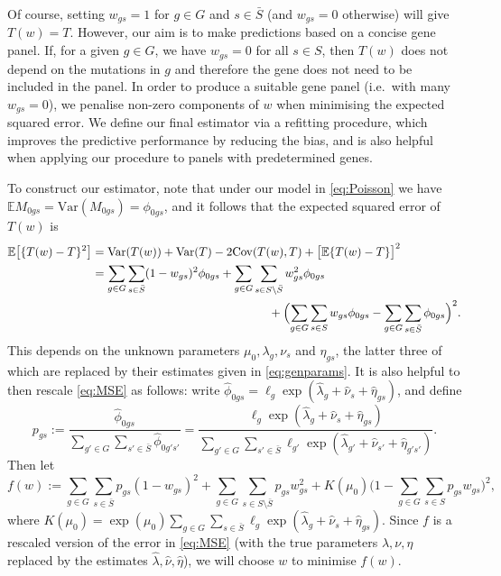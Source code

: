 \documentclass[12pt]{article}
\newcommand{\var}{\mathrm{Var}}
\begin{document}
Of course, setting $w_{gs}= 1$ for $g \in G$ and $s \in \bar{S}$ (and $w_{gs} = 0$ otherwise) will give $T(w) = T$.  However, our aim is to make predictions based on a concise gene panel. If, for a given $g \in G$, we have $w_{gs} = 0$ for all $s \in S$, then $T(w)$ does not depend on the mutations in $g$ and therefore the gene does not need to be included in the panel. In order to produce a suitable gene panel (i.e.~with many $w_{gs} = 0$), we penalise non-zero components of $w$ when minimising the expected squared error. We define our final estimator via a refitting procedure, which improves the predictive performance by reducing the bias, and is also helpful when applying our procedure to panels with predetermined genes.

To construct our estimator, note that under our model in \eqref{eq:Poisson} we have $\mathbb{E}M_{0gs} = \var(M_{0gs}) = \phi_{0gs}$, and it follows that the expected squared error of $T(w)$ is
\begin{align}
\label{eq:MSE}
\mathbb{E}\bigl[\{T(w) - T\}^2\bigr] & = \mathrm{Var}(T(w)) + \mathrm{Var}(T) - 2\mathrm{Cov}(T(w), T) + \bigl[\mathbb{E}\{T(w) - T\}\bigr]^2  \nonumber \\
& = \sum_{g \in G} \sum_{s \in \bar{S}}(1- w_{gs})^2\phi_{0gs} + \sum_{g \in G} \sum_{s \in S \setminus \bar{S}}w_{gs}^2\phi_{0gs}  \nonumber \\ & \hspace{150pt} + \Bigl(\sum_{g \in G}\sum_{s \in S}w_{gs}\phi_{0gs}
- \sum_{g \in G} \sum_{s \in \bar{S}}\phi_{0gs} \Bigr)^2.
\end{align} 
This depends on the unknown parameters $\mu_0, \lambda_g, \nu_s$ and $\eta_{gs}$, the latter three of which are replaced by their estimates given in \eqref{eq:genparams}.  It is also helpful to then rescale  \eqref{eq:MSE} as follows: write $\hat{\phi}_{0gs} = \ell_g\exp(\hat{\lambda}_g + \hat{\nu}_s + \hat{\eta}_{gs})$, and define
\[
p_{gs}  := \frac{\hat{\phi}_{0gs}}{\sum_{g' \in G} \sum_{s' \in \bar{S}} \hat{\phi}_{0g's'}} = \frac{\ell_g \exp(\hat{\lambda}_g + \hat{\nu}_s + \hat{\eta}_{gs})}{\sum_{g'\in G} \sum_{s'\in \bar{S}} \ell_{g'} \exp(\hat{\lambda}_{g'} + \hat{\nu}_{s'} + \hat{\eta}_{g's'})}.
\]
Then let
\[
f(w) := \sum_{g \in G}\sum_{s \in \bar{S}} p_{gs}(1-w_{gs})^2  + \sum_{g \in G}\sum_{ s\in S \setminus \bar{S}}p_{gs} w_{gs}^2 + K(\mu_0)\big( 1 - \sum_{g \in G}\sum_{s \in S}  p_{gs}w_{gs} \big)^2,
\]
where $K(\mu_0) = \exp(\mu_0)\sum_{g \in G}\sum_{s \in \bar{S}} \ell_{g}\exp(\hat{\lambda}_g + \hat{\nu}_s + \hat{\eta}_{gs})$. Since $f$ is a rescaled version of the error in \eqref{eq:MSE} (with the true parameters $\lambda, \nu, \eta$ replaced by the estimates $\hat{\lambda}, \hat{\nu}, \hat{\eta}$), we will choose $w$ to minimise $f(w)$.  
\end{document}
